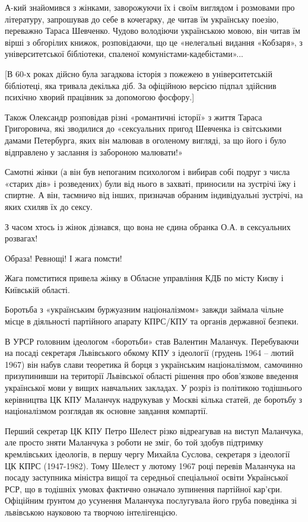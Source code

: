 А-кий знайомився з жінками, заворожуючи їх і своїм виглядом і розмовами про
літературу, запрошував до себе в кочегарку, де читав їм українську поезію,
переважно Тараса Шевченко. Чудово володіючи українською мовою, він читав їм
вірші з обгорілих книжок, розповідаючи, що це «нелегальні видання «Кобзаря», з
університетської бібліотеки, спаленої комуністами-кадебістами»... 

[В 60-х роках дійсно була загадкова історія з пожежею в університетській
бібліотеці, яка тривала декілька діб. За офіційною версією підпал здійснив
психічно хворий працівник за допомогою фосфору.]

Також Олександр розповідав різні «романтичні історії» з життя Тараса
Григоровича, які зводилися до «сексуальних пригод Шевченка із світськими дамами
Петербурга, яких він малював в оголеному вигляді, за що його і було відправлено
у заслання із забороною малювати!»

Самотні жінки (а він був непоганим психологом і вибирав собі подруг з числа
«старих дів» і розведених) були від нього в захваті, приносили на зустрічі їжу
і спиртне. А він, таємничо від інших, призначав обраним індивідуальні зустрічі,
на яких схиляв їх до сексу.

З часом хтось із жінок дізнався, що вона не єдина обранка О.А. в сексуальних
розвагах! 

Образа! Ревнощі! І жага помсти!

Жага помститися привела жінку в Обласне управління КДБ по місту Києву і
Київській області. 

Боротьба з «українським буржуазним націоналізмом» завжди займала чільне місце в
діяльності партійного апарату КПРС/КПУ та органів державної безпеки. 

В УРСР головним ідеологом «боротьби» став Валентин Маланчук. Перебуваючи на
посаді секретаря Львівського обкому КПУ з ідеології (грудень 1964 – лютий 1967)
він набув слави теоретика й борця з українським націоналізмом, самочинно
призупинивши на території Львівської області рішення про обов'язкове введення
української мови у вищих навчальних закладах. У розріз із політикою тодішнього
керівництва ЦК КПУ Маланчук надрукував у Москві кілька статей, де боротьбу з
націоналізмом розглядав як основне завдання компартії.

Перший секретар ЦК КПУ Петро Шелест різко відреагував на виступ Маланчука, але
просто зняти Маланчука з роботи не зміг, бо той здобув підтримку кремлівських
ідеологів, в першу чергу Михайла Суслова, секретаря з ідеології ЦК КПРС
(1947-1982). Тому Шелест у лютому 1967 році перевів Маланчука на посаду
заступника міністра вищої та середньої спеціальної освіти Української РСР, що в
тодішніх умовах фактично означало зупинення партійної кар'єри. Офіційним
ґрунтом до усунення Маланчука послугувала його груба поведінка зі львівською
науковою та творчою інтелігенцією. 

